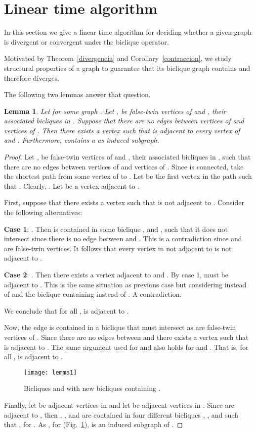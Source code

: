 \documentclass[12pt]{article}
\newtheorem{lemma}[theorem]{Lemma}
\begin{document}
\section{Linear time algorithm}\label{algolinear}

In this section we give a linear time algorithm for deciding whether a given
graph is divergent or convergent under the biclique operator.

Motivated by Theorem~\ref{divergencia} and Corollary~\ref{contraccion}, we study structural properties of a graph  to guarantee that 
its biclique graph  contains  and therefore  diverges.

The following two lemmas answer that question.

\begin{lemma}\label{2gemelos}
Let  for some graph . Let ,  be false-twin vertices of  and
,  their associated bicliques in . Suppose that there are no edges
between vertices of  and vertices of . Then there exists a vertex  such that  is adjacent to every vertex of  and .
Furthermore,  contains a  as induced subgraph.
\end{lemma}

\begin{proof} Let ,  be false-twin vertices of  and ,  their associated bicliques in , such that there are no edges between vertices of  and vertices of . Since  is connected, take the shortest path from some vertex of  to . Let  be the first vertex in the path such that . Clearly, . Let  be a vertex adjacent to . 

First, suppose that there exists a vertex  such that  is not adjacent to . Consider the following alternatives:

\textbf{Case 1}: . Then  is contained in some biclique ,  and , such that it does not intersect  since there is no edge between  and . This is a contradiction since  and  are false-twin vertices. It follows that every vertex in  not adjacent to  is not adjacent to .

\textbf{Case 2}: . Then there exists a vertex  adjacent to  and . By case 1,  must be adjacent to . This is the same situation as previous case but considering  instead of  and the biclique containing  instead of . A contradiction.

We conclude that for all ,  is adjacent to .

Now, the edge  is contained in a biclique  that must intersect  as  are false-twin vertices of . Since there are no edges between  and  there exists a vertex 
 such that  is adjacent to . The same argument used for  and  also holds for  and . That is, for all 
,  is adjacent to .

\begin{figure}[ht!]
	\centering
	\texttt{[image: lemma1]}
	\caption{Bicliques  and  with  new bicliques containing .}
	\label{Figlemma1}
\end{figure}

Finally, let  be adjacent vertices in  and let  be adjacent vertices in . Since  are adjacent to , then , ,  and  are contained in four different bicliques , ,  and  such that , for . As , for  (Fig.~\ref{Figlemma1}),  is an induced subgraph of .
\end{proof}
\end{document}
